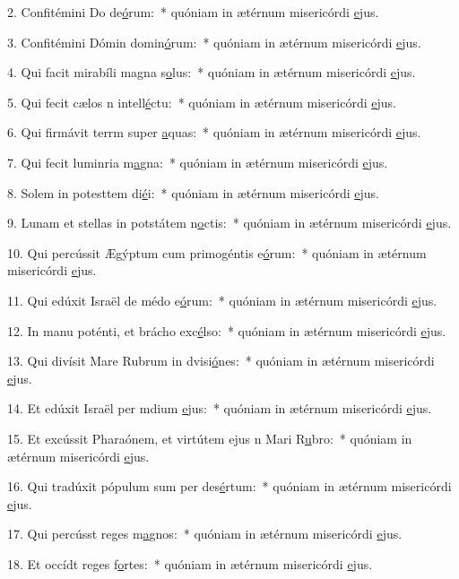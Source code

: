 2. Confitémini Do de\uline{ó}rum:~* quóniam in ætérnum misericórdi \uline{e}jus.\par 
3. Confitémini Dómin domin\uline{ó}rum:~* quóniam in ætérnum misericórdi \uline{e}jus.\par 
4. Qui facit mirabíli magna s\uline{o}lus:~* quóniam in ætérnum misericórdi \uline{e}jus.\par 
5. Qui fecit cælos n intell\uline{é}ctu:~* quóniam in ætérnum misericórdi \uline{e}jus.\par 
6. Qui firmávit terrm super \uline{a}quas:~* quóniam in ætérnum misericórdi \uline{e}jus.\par 
7. Qui fecit luminria m\uline{a}gna:~* quóniam in ætérnum misericórdi \uline{e}jus.\par 
8. Solem in potesttem di\uline{é}i:~* quóniam in ætérnum misericórdi \uline{e}jus.\par 
9. Lunam et stellas in potstátem n\uline{o}ctis:~* quóniam in ætérnum misericórdi \uline{e}jus.\par 
10. Qui percússit Ægýptum cum primogéntis e\uline{ó}rum:~* quóniam in ætérnum misericórdi \uline{e}jus.\par 
11. Qui edúxit Israël de médo e\uline{ó}rum:~* quóniam in ætérnum misericórdi \uline{e}jus.\par 
12. In manu poténti, et brácho exc\uline{é}lso:~* quóniam in ætérnum misericórdi \uline{e}jus.\par 
13. Qui divísit Mare Rubrum in dvisi\uline{ó}nes:~* quóniam in ætérnum misericórdi \uline{e}jus.\par 
14. Et edúxit Israël per mdium \uline{e}jus:~* quóniam in ætérnum misericórdi \uline{e}jus.\par 
15. Et excússit Pharaónem, et virtútem ejus n Mari R\uline{u}bro:~* quóniam in ætérnum misericórdi \uline{e}jus.\par 
16. Qui tradúxit pópulum sum per des\uline{é}rtum:~* quóniam in ætérnum misericórdi \uline{e}jus.\par 
17. Qui percússt reges m\uline{a}gnos:~* quóniam in ætérnum misericórdi \uline{e}jus.\par 
18. Et occídt reges f\uline{o}rtes:~* quóniam in ætérnum misericórdi \uline{e}jus.\par 
